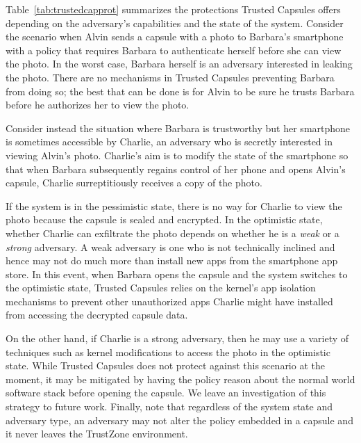 Table~\ref{tab:trustedcapprot} summarizes the protections Trusted Capsules
offers depending on the adversary's capabilities and the state of the
system. Consider the scenario when Alvin sends a capsule with a photo to
Barbara's smartphone with a policy that requires Barbara to authenticate herself
before she can view the photo. In the worst case, Barbara herself is an
adversary interested in leaking the photo. There are no mechanisms in Trusted
Capsules preventing Barbara from doing so; the best that can be done is for Alvin to
be sure he trusts Barbara before he authorizes her to view the photo.

Consider instead the situation where Barbara is trustworthy but her smartphone
is sometimes accessible by Charlie, an adversary who is secretly interested in
viewing Alvin's photo. Charlie's aim is to modify the state of the smartphone so
that when Barbara subsequently regains control of her phone and opens Alvin's
capsule, Charlie surreptitiously receives a copy of the photo.

If the system is in the pessimistic state, there is no way for Charlie to view
the photo because the capsule is sealed and encrypted. In the optimistic state,
whether Charlie can exfiltrate the photo depends on whether he is a {\em weak}
or a {\em strong} adversary. A weak adversary is one who is not technically
inclined and hence may not do much more than install new apps from the
smartphone app store. In this event, when Barbara opens the capsule and the
system switches to the optimistic state, Trusted Capsules relies on the kernel's
app isolation mechanisms to prevent other unauthorized apps Charlie might have
installed from accessing the decrypted capsule data.

On the other hand, if Charlie is a strong adversary, then he may use a variety of
techniques such as kernel modifications to access the photo in the optimistic
state. While Trusted Capsules does not protect against this scenario at the
moment, it may be mitigated by having the policy reason about the normal world
software stack before opening the capsule. We leave an investigation of this
strategy to future work. Finally, note that regardless of the system state and
adversary type, an adversary may not alter the policy embedded in a capsule and
it never leaves the TrustZone environment.

%
